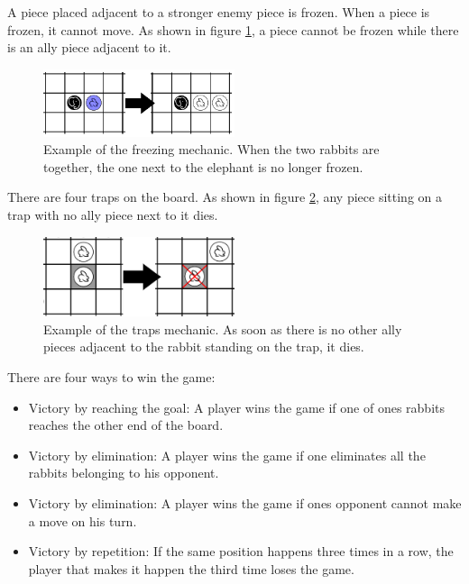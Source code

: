A piece placed adjacent to a stronger enemy piece is frozen. When a piece is frozen, it cannot move. As shown in figure \ref{fig:freeze}, a piece cannot be frozen while there is an ally piece adjacent to it.

\begin{figure}[!h]
\centering
\includegraphics[width=0.5\textwidth]{2TheGame_Gabriel/Pictures/Freeze.png}
\caption[Example of the freezing mechanic.]{Example of the freezing mechanic. When the two rabbits are together, the one next to the elephant is no longer frozen.}
\label{fig:freeze}
\end{figure}

There are four traps on the board. As shown in figure \ref{fig:trap}, any piece sitting on a trap with no ally piece next to it dies.

\begin{figure}[!h]
\centering
\includegraphics[width=0.5\textwidth]{2TheGame_Gabriel/Pictures/Trap.png}
\caption[Example of the traps mechanic.]{Example of the traps mechanic. As soon as there is no other ally pieces adjacent to the rabbit standing on the trap, it dies.}
\label{fig:trap}
\end{figure}

There are four ways to win the game:

\begin{itemize}
\item Victory by reaching the goal: A player wins the game if one of ones rabbits reaches the other end of the board.
\item Victory by elimination: A player wins the game if one eliminates all the rabbits belonging to his opponent.
\item Victory by elimination: A player wins the game if ones opponent cannot make a move on his turn.
\item Victory by repetition: If the same position happens three times in a row, the player that makes it happen the third time loses the game.
\end{itemize}
